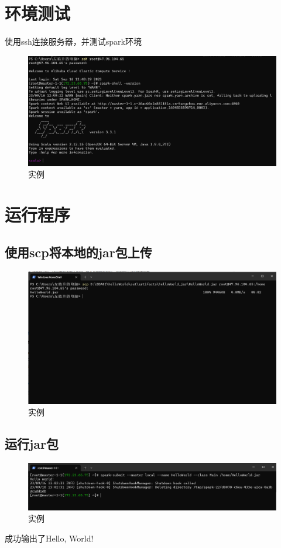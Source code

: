 \section{环境测试}
使用ssh连接服务器，并测试spark环境
\begin{figure}[H]
  \centering
  \includegraphics[width=\textwidth]{figure/ssh.png}
  \caption{实例}
  \label{fig:my_label}
\end{figure}

\section{运行程序}
\subsection{使用scp将本地的jar包上传}
\begin{figure}[H]
  \centering
  \includegraphics[width=\textwidth]{figure/scp.png}
  \caption{实例}
  \label{fig:my_label}
\end{figure}

\subsection{运行jar包}
\begin{figure}[H]
  \centering
  \includegraphics[width=\textwidth]{figure/run.png}
  \caption{实例}
  \label{fig:my_label}
\end{figure}
成功输出了Hello, World!

